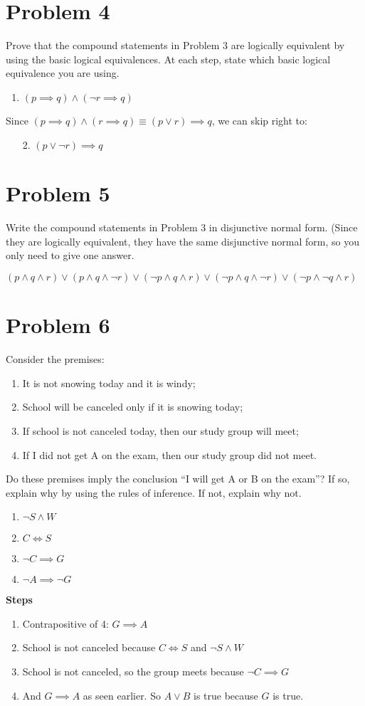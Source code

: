 \documentclass{article}
\newenvironment{problem}[1]{
  \nobreak\section*{Problem #1}
}{}
\begin{document}
  \begin{problem}{4}
    Prove that the compound statements in Problem 3 are logically equivalent by using the basic logical equivalences. At each step, state which basic logical equivalence you are using.
    \begin{enumerate}
      \item $(p \implies q) \wedge (\neg r \implies q)$
    \end{enumerate}
    Since $(p \implies q) \wedge (r \implies q) \equiv (p \vee r) \implies q$, we can skip right to:
    \begin{enumerate}
      \item[2.] $(p \vee \neg r) \implies q$ 
    \end{enumerate}
  \end{problem}

  \begin{problem}{5}
    Write the compound statements in Problem 3 in disjunctive normal form. (Since they are logically equivalent, they have the same disjunctive normal form, so you only need to give one answer.
    \begin{center}
      $(p \wedge q \wedge r) \vee (p \wedge q \wedge \neg r) \vee (\neg p \wedge q \wedge r) \vee (\neg p \wedge q \wedge \neg r) \vee (\neg p \wedge \neg q \wedge r)$
    \end{center}
  \end{problem}

  \begin{problem}{6}
    Consider the premises:
    \begin{enumerate}
      \item It is not snowing today and it is windy;
      \item School will be canceled only if it is snowing today;
      \item If school is not canceled today, then our study group will meet;
      \item If I did not get A on the exam, then our study group did not meet.
    \end{enumerate}
    Do these premises imply the conclusion “I will get A or B on the exam”? If so, explain why by using the rules of inference. If not, explain why not.
    \begin{enumerate}
      \item $\neg S \wedge W$
      \item $C \iff S$
      \item $\neg C \implies G$
      \item $\neg A \implies \neg G$
    \end{enumerate}
    \textbf{Steps}
    \begin{enumerate}
      \item Contrapositive of 4: $G \implies A$
      \item School is not canceled because $C \iff S$ and $\neg S \wedge W$
      \item School is not canceled, so the group meets because $\neg C \implies G$
      \item And $G \implies A$ as seen earlier. So $A \vee B$ is true because $G$ is true.
    \end{enumerate}
  \end{problem}
\end{document}
